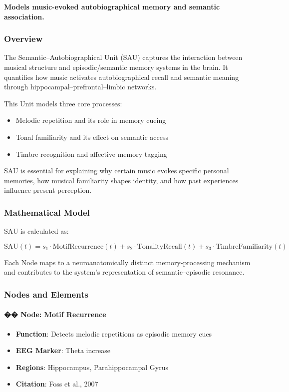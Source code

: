 \textbf{Models music-evoked autobiographical memory and semantic association.}

\subsubsection*{Overview}

The Semantic–Autobiographical Unit (SAU) captures the interaction between musical structure and episodic/semantic memory systems in the brain. It quantifies how music activates autobiographical recall and semantic meaning through hippocampal–prefrontal–limbic networks.

This Unit models three core processes:

\begin{itemize}
    \item Melodic repetition and its role in memory cueing
    \item Tonal familiarity and its effect on semantic access
    \item Timbre recognition and affective memory tagging
\end{itemize}

SAU is essential for explaining why certain music evokes specific personal memories, how musical familiarity shapes identity, and how past experiences influence present perception.

\subsubsection*{Mathematical Model}

SAU is calculated as:

\[
\text{SAU}(t) = s_1 \cdot \text{MotifRecurrence}(t) + s_2 \cdot \text{TonalityRecall}(t) + s_3 \cdot \text{TimbreFamiliarity}(t)
\]

Each Node maps to a neuroanatomically distinct memory-processing mechanism and contributes to the system’s representation of semantic–episodic resonance.

\subsubsection*{Nodes and Elements}

\paragraph{�� Node: Motif Recurrence}

\begin{itemize}
    \item \textbf{Function}: Detects melodic repetitions as episodic memory cues
    \item \textbf{EEG Marker}: Theta increase
    \item \textbf{Regions}: Hippocampus, Parahippocampal Gyrus
    \item \textbf{Citation}: Foss et al., 2007
\end{itemize}

